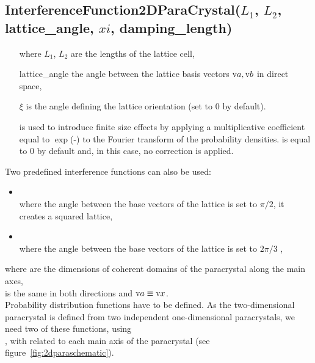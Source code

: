 \FloatBarrier

\newpage%
\subsection{InterferenceFunction2DParaCrystal($L_1$, $L_2$, lattice\_angle, $xi$, damping\_length)} %
\begin{itemize}
\item[where] $L_1$, $L_2$ are the lengths of the lattice cell,
\item[] lattice\_angle the angle between the lattice basis vectors $\text{v}{a}, \text{v}{b}$ in direct space,
\item[] $\xi$ is the angle defining the lattice orientation (set to $0$ by default).
\item[]  is used to introduce finite size effects by applying a multiplicative coefficient equal to  $\exp$(-) to the Fourier transform of the probability densities.  is equal to 0 by default and, in this case, no correction is applied.
\end{itemize}
Two predefined interference functions can also be used:
\begin{itemize}
\item  {}\\
where the angle between the base vectors of the lattice is set to $\pi/2$,
it creates a squared lattice,
\item {}\\
where the angle between the base vectors of the lattice is set to $2\pi/3$ ,
\end{itemize}
where
 are the dimensions of coherent domains of the paracrystal along the main axes,\\  is the same in both directions and $\text{v}{a}\equiv \text{v}{x}$.\\

Probability distribution functions have to be defined. As the two-dimensional paracrystal is defined from two independent one-dimensional paracrystals, we need two of these functions, using\\ , with  related to each main axis of the paracrystal (see figure~\ref{fig:2dparaschematic}).


